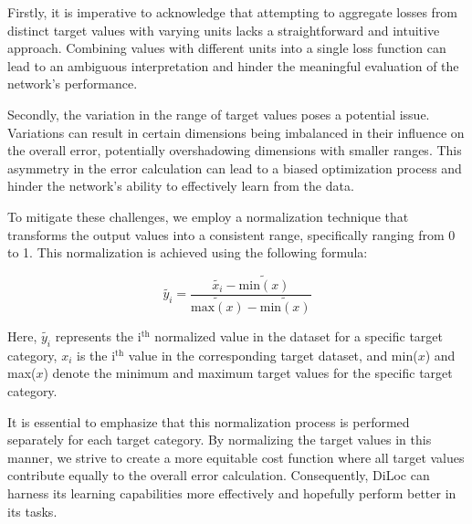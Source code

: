 \documentclass[a4paper, UKenglish, 11pt]{uiomaster}
\begin{document}
Firstly, it is imperative to acknowledge that attempting to aggregate  losses from distinct target values with varying units lacks a straightforward and intuitive approach. Combining values with different units into a single loss function can lead to an ambiguous interpretation and hinder the meaningful evaluation of the network's performance.

Secondly, the variation in the range of target values poses a potential issue. Variations can result in certain dimensions being imbalanced in their influence on the overall error, potentially overshadowing dimensions with smaller ranges. This asymmetry in the error calculation can lead to a biased optimization process and hinder the network's ability to effectively learn from the data.

To mitigate these challenges, we employ a normalization technique that transforms the output values into a consistent range, specifically ranging from 0 to 1. This normalization is achieved using the following formula:

\begin{equation}
\tilde{y_i} = \frac{\tilde{x_i} - \tilde{\text{min}(x)}}{\tilde{\text{max}(x)} - \tilde{\text{min}(x)}}
\label{eq:scale_target}
\end{equation}

Here, $\tilde{y_i}$ represents the i$^{\text{th}}$ normalized value in the dataset for a specific target category, $x_i$ is the i$^{\text{th}}$ value in the corresponding target dataset, and min($x$) and max($x$) denote the minimum and maximum target values for the specific target category.

It is essential to emphasize that this normalization process is performed separately for each target category. By normalizing the target values in this manner, we strive to create a more equitable cost function where all target values contribute equally to the overall error calculation. Consequently, DiLoc can harness its learning capabilities more effectively and hopefully perform better in its tasks.
\end{document}
